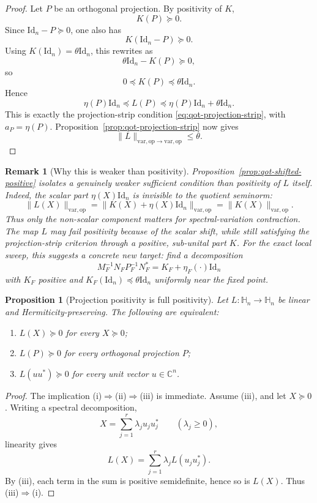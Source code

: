 \documentclass[11pt]{article}
\newcommand{\CC}{\mathbb{C}}
\newcommand{\Id}{\mathrm{Id}}
\newcommand{\Hh}{\mathbb{H}}
\newcommand{\op}{\mathrm{op}}
\newcommand{\varop}{\mathrm{var},\op}
\theoremstyle{plain}
\newtheorem{proposition}{Proposition}[section]
\newtheorem{remark}{Remark}[section]
\begin{document}
\begin{proof}
Let $P$ be an orthogonal projection.
By positivity of $K$,
\[
K(P)\succeq 0.
\]
Since $\Id_n-P\succeq 0$, one also has
\[
K(\Id_n-P)\succeq 0.
\]
Using $K(\Id_n)=\theta \Id_n$, this rewrites as
\[
\theta \Id_n-K(P)\succeq 0,
\]
so
\[
0\preceq K(P)\preceq \theta \Id_n.
\]
Hence
\[
\eta(P)\Id_n
\preceq
L(P)
\preceq
\eta(P)\Id_n+\theta \Id_n.
\]
This is exactly the projection-strip condition \eqref{eq:qot-projection-strip}, with $a_P=\eta(P)$.
Proposition~\ref{prop:qot-projection-strip} now gives
\[
\|L\|_{\varop\to\varop}\le \theta.
\]
\end{proof}

\begin{remark}[Why this is weaker than positivity]
\label{rem:qot-shifted-positive-weaker}
Proposition~\ref{prop:qot-shifted-positive} isolates a genuinely weaker sufficient condition than positivity of $L$ itself.
Indeed, the scalar part $\eta(X)\Id_n$ is invisible to the quotient seminorm:
\[
\|L(X)\|_{\varop}
=
\|K(X)+\eta(X)\Id_n\|_{\varop}
=
\|K(X)\|_{\varop}.
\]
Thus only the non-scalar component matters for spectral-variation contraction.
The map $L$ may fail positivity because of the scalar shift, while still satisfying the projection-strip criterion through a positive, sub-unital part $K$.
For the exact local sweep, this suggests a concrete new target:
find a decomposition
\[
M_F^{-1}N_F P_F^{-1}N_F^\ast
=
K_F+\eta_F(\cdot)\Id_n
\]
with $K_F$ positive and $K_F(\Id_n)\preceq \theta \Id_n$ uniformly near the fixed point.
\end{remark}

\begin{proposition}[Projection positivity is full positivity]
\label{prop:qot-projection-positivity}
Let $L:\Hh_n\to\Hh_n$ be linear and Hermiticity-preserving.
The following are equivalent:
\begin{enumerate}[label=\textnormal{(\roman*)}]
\item $L(X)\succeq 0$ for every $X\succeq 0$;
\item $L(P)\succeq 0$ for every orthogonal projection $P$;
\item $L(uu^\ast)\succeq 0$ for every unit vector $u\in \CC^n$.
\end{enumerate}
\end{proposition}

\begin{proof}
The implication (i)$\Rightarrow$(ii)$\Rightarrow$(iii) is immediate.
Assume (iii), and let $X\succeq 0$.
Writing a spectral decomposition,
\[
X=\sum_{j=1}^r \lambda_j u_j u_j^\ast
\qquad
(\lambda_j\ge 0),
\]
linearity gives
\[
L(X)=\sum_{j=1}^r \lambda_j L(u_j u_j^\ast).
\]
By (iii), each term in the sum is positive semidefinite, hence so is $L(X)$.
Thus (iii)$\Rightarrow$(i).
\end{proof}
\end{document}
